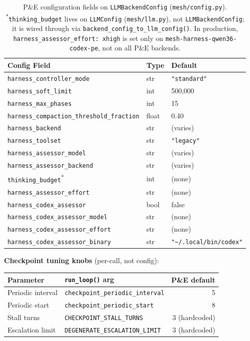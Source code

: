 \documentclass[11pt,letterpaper]{report}
\newcommand{\code}[1]{\texttt{#1}}
\begin{document}
\begin{table}[h]
\centering
\begin{tabular}{@{}lll@{}}
\toprule
Config Field & Type & Default \\
\midrule
\code{harness\_controller\_mode} & str & \code{"standard"} \\
\code{harness\_soft\_limit} & int & 500{,}000 \\
\code{harness\_max\_phases} & int & 15 \\
\code{harness\_compaction\_threshold\_fraction} & float & 0.40 \\
\code{harness\_backend} & str & (varies) \\
\code{harness\_toolset} & str & \code{"legacy"} \\
\code{harness\_assessor\_model} & str & (varies) \\
\code{harness\_assessor\_backend} & str & (varies) \\
\code{thinking\_budget}\textsuperscript{*} & int & (none) \\
\code{harness\_assessor\_effort} & str & (none) \\
\code{harness\_codex\_assessor} & bool & false \\
\code{harness\_codex\_assessor\_model} & str & (none) \\
\code{harness\_codex\_assessor\_effort} & str & (none) \\
\code{harness\_codex\_assessor\_binary} & str & \code{"\textasciitilde/.local/bin/codex"} \\
\bottomrule
\end{tabular}
\caption{P\&E configuration fields on \code{LLMBackendConfig}
(\code{mesh/config.py}). \textsuperscript{*}\code{thinking\_budget} lives
on \code{LLMConfig} (\code{mesh/llm.py}), not \code{LLMBackendConfig}; it
is wired through via \code{backend\_config\_to\_llm\_config()}.
In production, \code{harness\_assessor\_effort: xhigh} is set only on
\code{mesh-harness-qwen36-codex-pe}, not on all P\&E backends.}
\end{table}

\noindent\textbf{Checkpoint tuning knobs} (per-call, not config):

\begin{table}[h]
\centering
\begin{tabular}{@{}llr@{}}
\toprule
Parameter & \code{run\_loop()} arg & P\&E default \\
\midrule
Periodic interval & \code{checkpoint\_periodic\_interval} & 5 \\
Periodic start & \code{checkpoint\_periodic\_start} & 8 \\
Stall turns & \code{CHECKPOINT\_STALL\_TURNS} & 3 (hardcoded) \\
Escalation limit & \code{DEGENERATE\_ESCALATION\_LIMIT} & 3 (hardcoded) \\
\bottomrule
\end{tabular}
\end{table}
\end{document}
